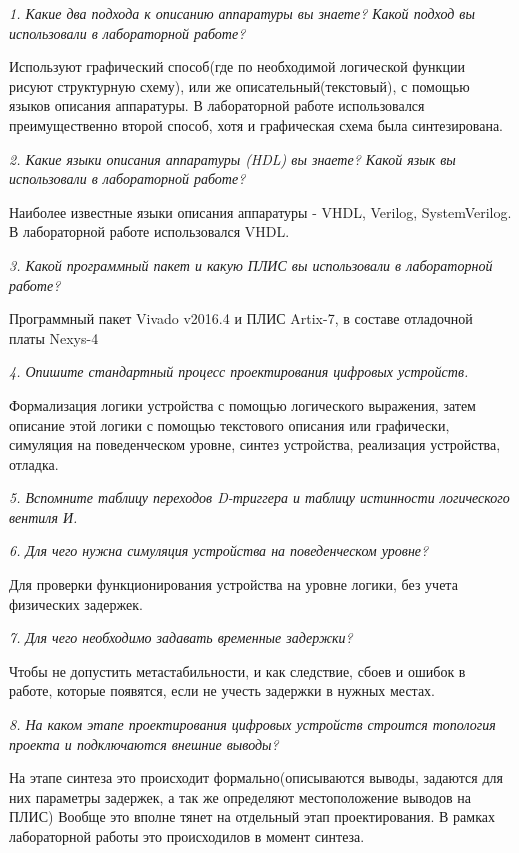 \begin{sloppypar}
\textit {1. Какие два подхода к описанию аппаратуры вы знаете? Какой подход
вы использовали в лабораторной работе?}

Используют графический способ(где по необходимой логической функции рисуют структурную схему), или же описательный(текстовый), с помощью языков описания аппаратуры. В лабораторной работе использовался преимущественно второй способ, хотя и графическая схема была синтезирована.

\textit {2. Какие языки описания аппаратуры (HDL) вы знаете? Какой язык вы
использовали в лабораторной работе?}

Наиболее известные языки описания аппаратуры  - VHDL, Verilog, SystemVerilog. В лабораторной работе использовался VHDL.

\textit {3. Какой программный пакет и какую ПЛИС вы использовали в лабораторной работе?}

Программный пакет Vivado v2016.4 и ПЛИС Artix-7, в составе отладочной платы Nexys-4

\textit {4. Опишите стандартный процесс проектирования цифровых устройств.}

Формализация логики устройства с помощью логического выражения, затем описание этой логики с помощью текстового описания или графически, симуляция на поведенческом уровне, синтез устройства, реализация устройства, отладка.

\textit {5. Вспомните таблицу переходов D-триггера и таблицу истинности логического вентиля И.}

\textit {6. Для чего нужна симуляция устройства на поведенческом уровне?}

Для проверки функционирования устройства на уровне логики, без учета физических задержек.

\textit {7. Для чего необходимо задавать временные задержки?}

Чтобы не допустить метастабильности, и как следствие, сбоев и ошибок в работе, которые появятся, если не учесть задержки в нужных местах.

\textit {8. На каком этапе проектирования цифровых устройств строится топология проекта и подключаются внешние выводы?}

На этапе синтеза это происходит формально(описываются выводы, задаются для них параметры задержек, а так же определяют местоположение выводов на ПЛИС)
Вообще это вполне тянет на отдельный этап проектирования. В рамках лабораторной работы это происходилов в момент синтеза.


\end{sloppypar}
